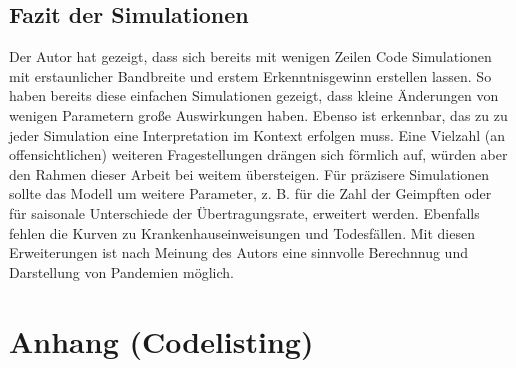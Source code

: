 \documentclass[12pt]{article}
\begin{document}
\subsection{Fazit der Simulationen}
Der Autor hat gezeigt, dass sich bereits mit wenigen Zeilen Code Simulationen mit erstaunlicher Bandbreite und erstem Erkenntnisgewinn erstellen lassen. So haben bereits diese einfachen Simulationen gezeigt, dass kleine Änderungen von wenigen Parametern große Auswirkungen haben. Ebenso ist erkennbar, das zu zu jeder Simulation eine Interpretation im Kontext erfolgen muss. Eine Vielzahl (an offensichtlichen) weiteren Fragestellungen drängen sich förmlich auf, würden aber den Rahmen dieser Arbeit bei weitem übersteigen. Für präzisere Simulationen sollte das Modell um weitere Parameter, z. B. für die Zahl der Geimpften oder für saisonale Unterschiede der Übertragungsrate, erweitert werden. Ebenfalls fehlen die Kurven zu Krankenhauseinweisungen und Todesfällen. Mit diesen Erweiterungen ist nach Meinung des Autors eine sinnvolle Berechnnug und Darstellung von Pandemien möglich.

\newpage
\section{Anhang (Codelisting)} \label{sec:Anhang}

\newpage
\printbibliography
\end{document}
